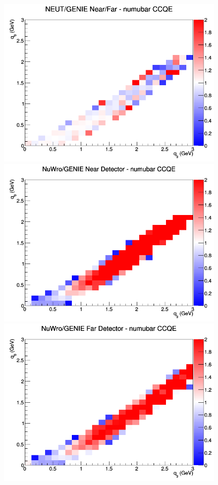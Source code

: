 \begin{figure}[h]
\endminipage
{}
\includegraphics[width=\linewidth]{q0_q3/nominal/ratios/CCQE_NEUT_GENIE_numubar_NF_q3_q0.png}
\endminipage
\newline
{}
\includegraphics[width=\linewidth]{q0_q3/nominal/ratios/CCQE_NuWro_GENIE_numubar_near_q3_q0.png}
\endminipage
{}
\includegraphics[width=\linewidth]{q0_q3/nominal/ratios/CCQE_NuWro_GENIE_numubar_far_q3_q0.png}

\end{figure}
